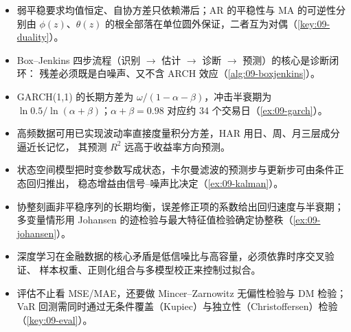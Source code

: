\begin{summarybox}
\begin{itemize}[leftmargin=1.4em, itemsep=2pt]
  \item 弱平稳要求均值恒定、自协方差只依赖滞后；AR 的平稳性与 MA 的可逆性分别由
  $\phi(z)$、$\theta(z)$ 的根全部落在单位圆外保证，二者互为对偶（\cref{key:09-duality}）。
  \item Box--Jenkins 四步流程（识别 $\to$ 估计 $\to$ 诊断 $\to$ 预测）的核心是诊断闭环：
  残差必须既是白噪声、又不含 ARCH 效应（\cref{alg:09-boxjenkins}）。
  \item GARCH(1,1) 的长期方差为 $\omega/(1-\alpha-\beta)$，冲击半衰期为
  $\ln 0.5/\ln(\alpha+\beta)$；$\alpha+\beta=0.98$ 对应约 34 个交易日（\cref{ex:09-garch}）。
  \item 高频数据可用已实现波动率直接度量积分方差，HAR 用日、周、月三层成分逼近长记忆，
  其预测 $R^2$ 远高于收益率方向预测。
  \item 状态空间模型把时变参数写成状态，卡尔曼滤波的预测步与更新步可由条件正态回归推出，
  稳态增益由信号--噪声比决定（\cref{ex:09-kalman}）。
  \item 协整刻画非平稳序列的长期均衡，误差修正项的系数给出回归速度与半衰期；
  多变量情形用 Johansen 的迹检验与最大特征值检验确定协整秩（\cref{ex:09-johansen}）。
  \item 深度学习在金融数据的核心矛盾是低信噪比与高容量，必须依靠时序交叉验证、
  样本权重、正则化组合与多模型校正来控制过拟合。
  \item 评估不止看 MSE/MAE，还要做 Mincer--Zarnowitz 无偏性检验与 DM 检验；
  VaR 回测需同时通过无条件覆盖（Kupiec）与独立性（Christoffersen）检验（\cref{key:09-eval}）。
\end{itemize}
\end{summarybox}

